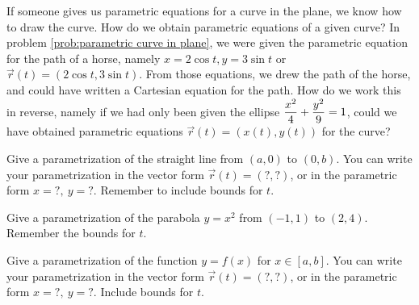 If someone gives us parametric equations for a curve in the plane, we know how to draw the curve.  How do we obtain parametric equations of a given curve? In problem \ref{prob:parametric curve in plane}, we were given the parametric equation for the path of a horse, namely $x=2\cos t, y=3 \sin t$ or $\vec r(t)=(2\cos t,3\sin t)$. From those equations, we drew the path of the horse, and could have written a Cartesian equation for the path. How do we work this in reverse, namely if we had only been given the ellipse $\displaystyle\frac{x^2}{4}+\frac{y^2}{9}=1$, could we have obtained parametric equations $\vec r(t)=(x(t),y(t))$ for the curve?



\begin{problem}
 Give a parametrization of the straight line from $(a,0)$ to $(0,b)$. 
 You can write your parametrization in the vector form $\vec r(t)=(?,?)$, or in the parametric form $x=?,\ y=?$. 
 Remember to include bounds for $t$. %
\end{problem}



\begin{problem}
 Give a parametrization of the parabola $y=x^2$ from $(-1,1)$ to $(2,4)$. 
 Remember the bounds for $t$.
\end{problem}


\begin{problem}
 Give a parametrization of the function $y=f(x)$ for $x\in[a,b]$.
 You can write your parametrization in the vector form $\vec r(t)=(?,?)$, or in the parametric form $x=?,\ y=?$. 
 Include bounds for $t$.
\end{problem}

